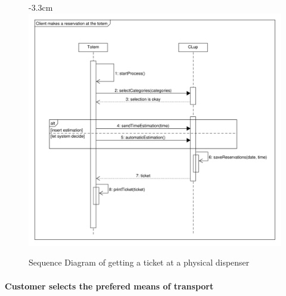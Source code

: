 \documentclass{article}
\begin{document}
\begin{center}
\begin{itemize}
					
				\end{itemize}
								\begin{figure}[!htb]
						\begin{adjustwidth} {-3.3cm}{}
							\centering
							\includegraphics[scale=0.62]{SD/11_getTicketAtTotem.pdf}\\
							\caption{Sequence Diagram of getting a ticket at a physical dispenser}
						\end{adjustwidth}
					\end{figure}
				\end{center}
			\newpage
			\paragraph{Customer selects the prefered means of transport}
			
\end{document}
